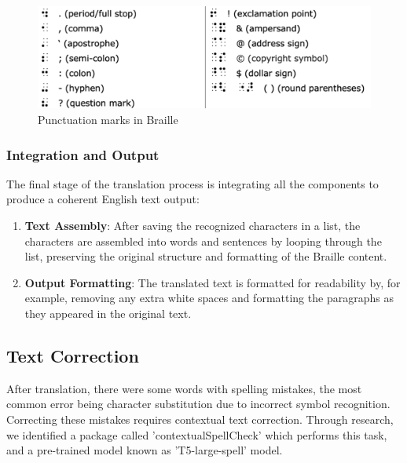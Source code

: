 \begin{figure}[h]
\centering
\includegraphics[width=1\textwidth]{punctuation.png}
\caption{Punctuation marks in Braille}
\label{fig:tacotron_model}
\end{figure}

\subsubsection{Integration and Output}

The final stage of the translation process is integrating all the components to produce a coherent English text output:

\begin{enumerate}
    \item \textbf{Text Assembly}: After saving the recognized characters in a list, the characters are assembled into words and sentences by looping through the list, preserving the original structure and formatting of the Braille content.
    \item \textbf{Output Formatting}: The translated text is formatted for readability by, for example, removing any extra white spaces and formatting the paragraphs as they appeared in the original text.
\end{enumerate}


\subsection{Text Correction}
After translation, there were some words with spelling mistakes, the most common error being character substitution due to incorrect symbol recognition. Correcting these mistakes requires contextual text correction. Through research, we identified a package called 'contextualSpellCheck' which performs this task, and a pre-trained model known as 'T5-large-spell' model.

